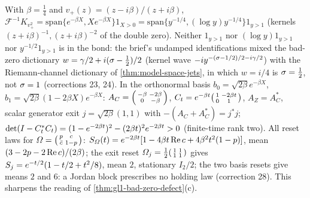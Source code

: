 \begin{proposition}
\label{prop:burnol-even-sector-chain}
With $\beta = \tfrac14$ and $v_+(z) = (z-i\beta)/(z+i\beta)$,
$\mathcal F^{-1}K_{v_+^2} = \mathrm{span}\{e^{-\beta X},Xe^{-\beta X}\}1_{X>0} = \mathrm{span}\{y^{-1/4},(\log y)y^{-1/4}\}1_{y>1}$
(kernels $(z+i\beta)^{-1},(z+i\beta)^{-2}$ of the double zero). Neither $1_{y>1}$ nor $(\log y)1_{y>1}$ nor $y^{-1/2}1_{y>1}$
is in the bond: the brief's undamped identifications mixed the bad-zero dictionary $w = \gamma/2+i(\sigma-\tfrac12)/2$ (kernel
wave $-iy^{-(\sigma-1/2)/2-i\gamma/2}$) with the Riemann-channel dictionary of \cref{thm:model-space-jets}, in which
$w = i/4$ is $\sigma = \tfrac12$, not $\sigma = 1$ (corrections 23, 24). In the orthonormal basis $b_0 = \sqrt{2\beta}e^{-\beta X}$,
$b_1 = \sqrt{2\beta}(1-2\beta X)e^{-\beta X}$: $A_C = \begin{psmallmatrix}-\beta&-2\beta\\0&-\beta\end{psmallmatrix}$,
$C_t = e^{-\beta t}\begin{psmallmatrix}1&-2\beta t\\0&1\end{psmallmatrix}$, $A_Z = A_C^{*}$, scalar generator exit
$j = \sqrt{2\beta}(1,1)$ with $-(A_C+A_C^{*}) = j^{*}j$; $\det(I-C_t^{*}C_t) = (1-e^{-2\beta t})^2-(2\beta t)^2e^{-2\beta t}>0$
(finite-time rank two). All reset laws for $\varOmega = \begin{psmallmatrix}p&c\\\bar c&1-p\end{psmallmatrix}$:
$S_{\varOmega}(t) = e^{-2\beta t}[1-4\beta t\operatorname{Re} c+4\beta^2t^2(1-p)]$, mean $(3-2p-2\operatorname{Re} c)/(2\beta)$; the exit reset
$\varOmega_j = \tfrac12\begin{psmallmatrix}1&1\\1&1\end{psmallmatrix}$ gives $S_j = e^{-t/2}(1-t/2+t^2/8)$, mean $2$,
stationary $I_2/2$; the two basis resets give means $2$ and $6$: a Jordan block prescribes no holding law (correction 28).
This sharpens the reading of \cref{thm:gl1-bad-zero-defect}(c).
\end{proposition}

